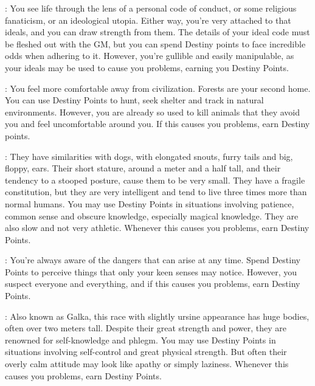 \begin{multicols}{2}
\begin{ffcolpage}
: You see life through the lens of a personal code of conduct, or some religious fanaticism, or an ideological utopia. Either way, you're very attached to that ideals, and you can draw strength from them. The details of your ideal code must be fleshed out with the GM, but you can spend Destiny points to face incredible odds when adhering to it. However, you're gullible and easily manipulable, as your ideals may be used to cause you problems, earning you Destiny Points.
\end{ffcolpage} \pw

\begin{ffcolpage}
: You feel more comfortable away from civilization. Forests are your second home. You can use Destiny Points to hunt, seek shelter and track in natural environments. However, you are already so used to kill animals that they avoid you and feel uncomfortable around you. If this causes you problems, earn Destiny points.
\end{ffcolpage} \pw

\begin{ffcolpage}
: They have similarities with dogs, with elongated snouts, furry tails and big, floppy, ears. Their short stature, around a meter and a half tall, and their tendency to a stooped posture, cause them to be very small. They have a fragile constitution, but they are very intelligent and tend to live three times more than normal humans. You may use Destiny Points in situations involving patience, common sense and obscure knowledge, especially magical knowledge. They are also slow and not very athletic. Whenever this causes you problems, earn Destiny Points.
\end{ffcolpage} \pw

\begin{ffcolpage}
: You're always aware of the dangers that can arise at any time. Spend Destiny Points to perceive things that only your keen senses may notice. However, you suspect everyone and everything, and if this causes you problems, earn Destiny Points.
\end{ffcolpage} \pw

\noindent\begin{minipage}{.35\textwidth-2\columnsep}
: Also known as Galka, this race with slightly ursine appearance has huge bodies, often over two meters tall. Despite their great strength and power, they are renowned for self-knowledge and phlegm. You may use Destiny Points in situations involving self-control and great physical strength. But often their overly calm attitude may look like apathy or simply laziness. Whenever this causes you problems, earn Destiny Points.
\end{minipage} \pw


\end{multicols}
